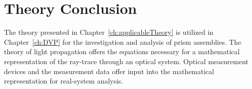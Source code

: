\section{Theory Conclusion}
The theory presented in Chapter~\ref{ch:applicableTheory} is utilized in Chapter~\ref{ch:DVP} for the investigation and analysis of prism assemblies. The theory of light propagation offers the equations necessary for a mathematical representation of the ray-trace through an optical system. Optical measurement devices and the measurement data offer input into the mathematical representation for real-system analysis.